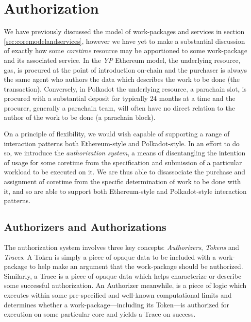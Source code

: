 \section{Authorization}\label{sec:authorization}

We have previously discussed the model of work-packages and services in section \ref{sec:coremodelandservices}, however we have yet to make a substantial discussion of exactly how some \emph{coretime} resource may be apportioned to some work-package and its associated service. In the \emph{YP} Ethereum model, the underlying resource, gas, is procured at the point of introduction on-chain and the purchaser is always the same agent who authors the data which describes the work to be done (\ie the transaction). Conversely, in Polkadot the underlying resource, a parachain slot, is procured with a substantial deposit for typically 24 months at a time and the procurer, generally a parachain team, will often have no direct relation to the author of the work to be done (\ie a parachain block).

On a principle of flexibility, we would wish \Jam capable of supporting a range of interaction patterns both Ethereum-style and Polkadot-style. In an effort to do so, we introduce the \emph{authorization system}, a means of disentangling the intention of usage for some coretime from the specification and submission of a particular workload to be executed on it. We are thus able to disassociate the purchase and assignment of coretime from the specific determination of work to be done with it, and so are able to support both Ethereum-style and Polkadot-style interaction patterns.

\subsection{Authorizers and Authorizations}

The authorization system involves three key concepts: \emph{Authorizers}, \emph{Tokens} and \emph{Traces}. A Token is simply a piece of opaque data to be included with a work-package to help make an argument that the work-package should be authorized. Similarly, a Trace is a piece of opaque data which helps characterize or describe some successful authorization. An Authorizer meanwhile, is a piece of logic which executes within some pre-specified and well-known computational limits and determines whether a work-package---including its Token---is authorized for execution on some particular core and yields a Trace on success.

